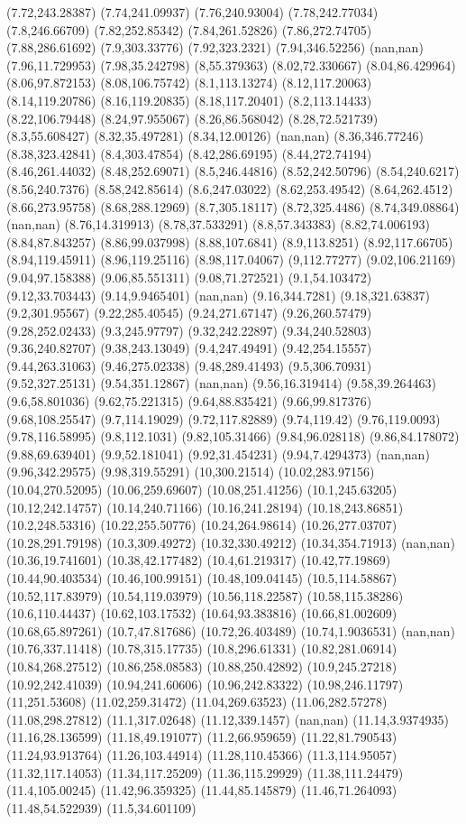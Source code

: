 (7.72,243.28387) (7.74,241.09937) (7.76,240.93004) (7.78,242.77034) (7.8,246.66709) (7.82,252.85342) (7.84,261.52826) (7.86,272.74705) (7.88,286.61692) (7.9,303.33776) (7.92,323.2321) (7.94,346.52256) (nan,nan) (7.96,11.729953) (7.98,35.242798) (8,55.379363) (8.02,72.330667) (8.04,86.429964) (8.06,97.872153) (8.08,106.75742) (8.1,113.13274) (8.12,117.20063) (8.14,119.20786) (8.16,119.20835) (8.18,117.20401) (8.2,113.14433) (8.22,106.79448) (8.24,97.955067) (8.26,86.568042) (8.28,72.521739) (8.3,55.608427) (8.32,35.497281) (8.34,12.00126) (nan,nan) (8.36,346.77246) (8.38,323.42841) (8.4,303.47854) (8.42,286.69195) (8.44,272.74194) (8.46,261.44032) (8.48,252.69071) (8.5,246.44816) (8.52,242.50796) (8.54,240.6217) (8.56,240.7376) (8.58,242.85614) (8.6,247.03022) (8.62,253.49542) (8.64,262.4512) (8.66,273.95758) (8.68,288.12969) (8.7,305.18117) (8.72,325.4486) (8.74,349.08864) (nan,nan) (8.76,14.319913) (8.78,37.533291) (8.8,57.343383) (8.82,74.006193) (8.84,87.843257) (8.86,99.037998) (8.88,107.6841) (8.9,113.8251) (8.92,117.66705) (8.94,119.45911) (8.96,119.25116) (8.98,117.04067) (9,112.77277) (9.02,106.21169) (9.04,97.158388) (9.06,85.551311) (9.08,71.272521) (9.1,54.103472) (9.12,33.703443) (9.14,9.9465401) (nan,nan) (9.16,344.7281) (9.18,321.63837) (9.2,301.95567) (9.22,285.40545) (9.24,271.67147) (9.26,260.57479) (9.28,252.02433) (9.3,245.97797) (9.32,242.22897) (9.34,240.52803) (9.36,240.82707) (9.38,243.13049) (9.4,247.49491) (9.42,254.15557) (9.44,263.31063) (9.46,275.02338) (9.48,289.41493) (9.5,306.70931) (9.52,327.25131) (9.54,351.12867) (nan,nan) (9.56,16.319414) (9.58,39.264463) (9.6,58.801036) (9.62,75.221315) (9.64,88.835421) (9.66,99.817376) (9.68,108.25547) (9.7,114.19029) (9.72,117.82889) (9.74,119.42) (9.76,119.0093) (9.78,116.58995) (9.8,112.1031) (9.82,105.31466) (9.84,96.028118) (9.86,84.178072) (9.88,69.639401) (9.9,52.181041) (9.92,31.454231) (9.94,7.4294373) (nan,nan) (9.96,342.29575) (9.98,319.55291) (10,300.21514) (10.02,283.97156) (10.04,270.52095) (10.06,259.69607) (10.08,251.41256) (10.1,245.63205) (10.12,242.14757) (10.14,240.71166) (10.16,241.28194) (10.18,243.86851) (10.2,248.53316) (10.22,255.50776) (10.24,264.98614) (10.26,277.03707) (10.28,291.79198) (10.3,309.49272) (10.32,330.49212) (10.34,354.71913) (nan,nan) (10.36,19.741601) (10.38,42.177482) (10.4,61.219317) (10.42,77.19869) (10.44,90.403534) (10.46,100.99151) (10.48,109.04145) (10.5,114.58867) (10.52,117.83979) (10.54,119.03979) (10.56,118.22587) (10.58,115.38286) (10.6,110.44437) (10.62,103.17532) (10.64,93.383816) (10.66,81.002609) (10.68,65.897261) (10.7,47.817686) (10.72,26.403489) (10.74,1.9036531) (nan,nan) (10.76,337.11418) (10.78,315.17735) (10.8,296.61331) (10.82,281.06914) (10.84,268.27512) (10.86,258.08583) (10.88,250.42892) (10.9,245.27218) (10.92,242.41039) (10.94,241.60606) (10.96,242.83322) (10.98,246.11797) (11,251.53608) (11.02,259.31472) (11.04,269.63523) (11.06,282.57278) (11.08,298.27812) (11.1,317.02648) (11.12,339.1457) (nan,nan) (11.14,3.9374935) (11.16,28.136599) (11.18,49.191077) (11.2,66.959659) (11.22,81.790543) (11.24,93.913764) (11.26,103.44914) (11.28,110.45366) (11.3,114.95057) (11.32,117.14053) (11.34,117.25209) (11.36,115.29929) (11.38,111.24479) (11.4,105.00245) (11.42,96.359325) (11.44,85.145879) (11.46,71.264093) (11.48,54.522939) (11.5,34.601109) 